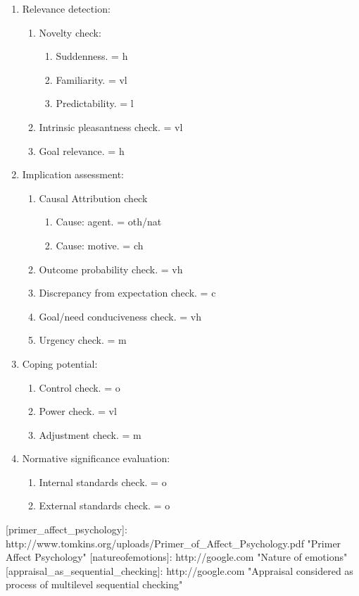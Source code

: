\begin{enumerate}
\item  Relevance detection:
\begin{enumerate}
\item  Novelty check:
\begin{enumerate}
\item  Suddenness. = h
\item  Familiarity. = vl
\item  Predictability. = l
\end{enumerate}
\item  Intrinsic pleasantness check. = vl
\item  Goal relevance. = h
\end{enumerate}
\item  Implication assessment:
\begin{enumerate}
\item  Causal Attribution check
\begin{enumerate}
\item  Cause: agent. = oth/nat
\item  Cause: motive. = ch
\end{enumerate}
\item  Outcome probability check. = vh
\item  Discrepancy from expectation check. = c
\item  Goal/need conduciveness check. = vh
\item  Urgency check. = m
\end{enumerate}
\item  Coping potential:
\begin{enumerate}
\item  Control check. = o
\item  Power check. = vl
\item  Adjustment check. = m
\end{enumerate}
\item  Normative significance evaluation:
\begin{enumerate}
\item  Internal standards check. = o
\item  External standards check. = o
\end{enumerate}
\end{enumerate}

[primer_affect_psychology]: http://www.tomkins.org/uploads/Primer_of_Affect_Psychology.pdf "Primer Affect Psychology"
[natureofemotions]: http://google.com "Nature of emotions"
[appraisal_as_sequential_checking]: http://google.com "Appraisal considered as process of multilevel sequential checking"
